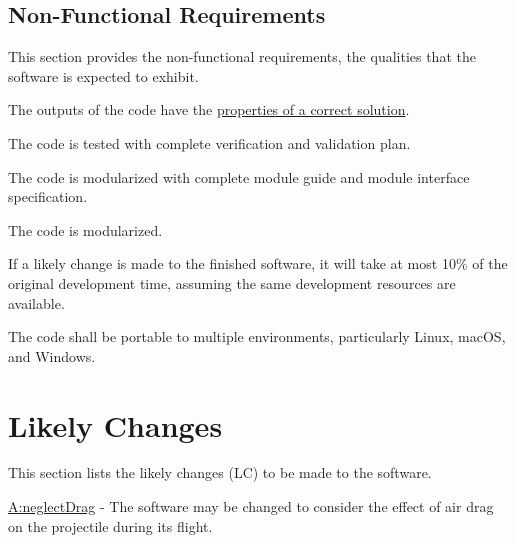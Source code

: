 \documentclass[12pt]{article}
\begin{document}
\subsection{Non-Functional Requirements}
\label{Sec:NFRs}
This section provides the non-functional requirements, the qualities that the software is expected to exhibit.

\begin{description}[font=\normalfont]
\item[Correctness:\phantomsection\label{correct}]{The outputs of the code have the \hyperref[Sec:CorSolProps]{properties of a correct solution}.}
\item[Verifiability:\phantomsection\label{verifiable}]{The code is tested with complete verification and validation plan.}
\item[Understandability:\phantomsection\label{understandable}]{The code is modularized with complete module guide and module interface specification.}
\item[Reusability:\phantomsection\label{reusable}]{The code is modularized.}
\item[Maintainability:\phantomsection\label{maintainable}]{If a likely change is made to the finished software, it will take at most 10$\%$ of the original development time, assuming the same development resources are available.}
\item[Portability:\phantomsection\label{portable}]{The code shall be portable to multiple environments, particularly Linux, macOS, and Windows.}
\end{description}
\section{Likely Changes}
\label{Sec:LCs}
This section lists the likely changes (LC) to be made to the software.

\begin{description}[font=\normalfont]
\item[Consider-Air-Drag:\phantomsection\label{considerAirDrag}]{\hyperref[neglectDrag]{A:neglectDrag} - The software may be changed to consider the effect of air drag on the projectile during its flight.}
\end{description}
\end{document}
